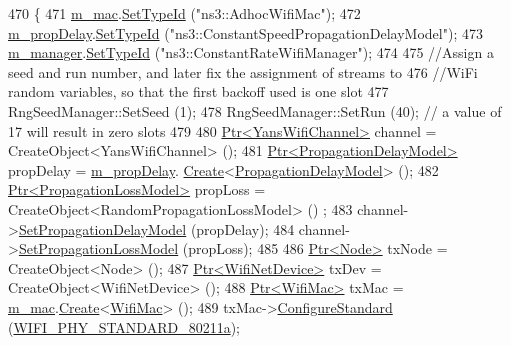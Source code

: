 \begin{DoxyCode}
470 \{
471   \hyperlink{classDcfImmediateAccessBroadcastTestCase_ab0a0eb92216037ec211e0fa87ac11d1c}{m\_mac}.\hyperlink{classns3_1_1ObjectFactory_a77dcd099064038a1eb7a6b8251229ec3}{SetTypeId} (\textcolor{stringliteral}{"ns3::AdhocWifiMac"});
472   \hyperlink{classDcfImmediateAccessBroadcastTestCase_a6fceb2537384282ce7ee4cdc47d5feef}{m\_propDelay}.\hyperlink{classns3_1_1ObjectFactory_a77dcd099064038a1eb7a6b8251229ec3}{SetTypeId} (\textcolor{stringliteral}{"ns3::ConstantSpeedPropagationDelayModel"});
473   \hyperlink{classDcfImmediateAccessBroadcastTestCase_ab8f20ef6ae6e7c13de2d3e5cb95bc052}{m\_manager}.\hyperlink{classns3_1_1ObjectFactory_a77dcd099064038a1eb7a6b8251229ec3}{SetTypeId} (\textcolor{stringliteral}{"ns3::ConstantRateWifiManager"});
474 
475   \textcolor{comment}{//Assign a seed and run number, and later fix the assignment of streams to}
476   \textcolor{comment}{//WiFi random variables, so that the first backoff used is one slot}
477   RngSeedManager::SetSeed (1);
478   RngSeedManager::SetRun (40);  \textcolor{comment}{// a value of 17 will result in zero slots}
479 
480   \hyperlink{classns3_1_1Ptr}{Ptr<YansWifiChannel>} channel = CreateObject<YansWifiChannel> ();
481   \hyperlink{classns3_1_1Ptr}{Ptr<PropagationDelayModel>} propDelay = \hyperlink{classDcfImmediateAccessBroadcastTestCase_a6fceb2537384282ce7ee4cdc47d5feef}{m\_propDelay}.
      \hyperlink{classns3_1_1ObjectFactory_a18152e93f0a6fe184ed7300cb31e9896}{Create}<\hyperlink{classns3_1_1PropagationDelayModel}{PropagationDelayModel}> ();
482   \hyperlink{classns3_1_1Ptr}{Ptr<PropagationLossModel>} propLoss = CreateObject<RandomPropagationLossModel> ()
      ;
483   channel->\hyperlink{classns3_1_1YansWifiChannel_a51ebdd5a1d897dc46cf9783ac2879b98}{SetPropagationDelayModel} (propDelay);
484   channel->\hyperlink{classns3_1_1YansWifiChannel_ad2f92be1fb34be0075141cbb4f779191}{SetPropagationLossModel} (propLoss);
485 
486   \hyperlink{classns3_1_1Ptr}{Ptr<Node>} txNode = CreateObject<Node> ();
487   \hyperlink{classns3_1_1Ptr}{Ptr<WifiNetDevice>} txDev = CreateObject<WifiNetDevice> ();
488   \hyperlink{classns3_1_1Ptr}{Ptr<WifiMac>} txMac = \hyperlink{classDcfImmediateAccessBroadcastTestCase_ab0a0eb92216037ec211e0fa87ac11d1c}{m\_mac}.\hyperlink{classns3_1_1ObjectFactory_a18152e93f0a6fe184ed7300cb31e9896}{Create}<\hyperlink{classns3_1_1WifiMac}{WifiMac}> ();
489   txMac->\hyperlink{classns3_1_1WifiMac_a16ec5352c804df83e42159ab4e2e73d8}{ConfigureStandard} (\hyperlink{group__wifi_gga1299834f4e1c615af3ca738033b76a49a22db1e8022db2c3450414b86c77b11e4}{WIFI\_PHY\_STANDARD\_80211a});

\end{DoxyCode}
